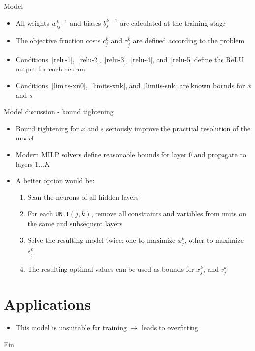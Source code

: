 \documentclass{beamer}
\newcommand{\UNIT}{\texttt{UNIT}$(j,k)$}
\begin{document}
\begin{frame}{Model}
  \begin{itemize}
  \item All weights $w_{ij}^{k-1}$ and biases $b_j^{k-1}$ are calculated at the training stage
  \item The objective function costs $c_j^k$ and $\gamma_j^k$ are defined according to the problem
  \item Conditions~\ref{relu-1},~\ref{relu-2},~\ref{relu-3},~\ref{relu-4}, and~\ref{relu-5} define the ReLU output for each neuron
  \item Conditions~\ref{limits-xn0},~\ref{limits-xnk}, and~\ref{limits-snk} are known bounds for $x$ and $s$
  \end{itemize}
\end{frame}

\begin{frame}{Model discussion - bound tightening}
  \begin{itemize}
  \item Bound tightening for $x$ and $s$ seriously improve the practical resolution of the model
  \item Modern MILP solvers define reasonable bounds for layer $0$ and propagate to layers $1 \dots K$
  \item A better option would be:
    \begin{enumerate}
    \item Scan the neurons of all hidden layers
    \item For each \UNIT, remove all constraints and variables from units on the same and subsequent layers
    \item Solve the resulting model twice: one to maximize $x_j^k$, other to maximize $s_j^k$
    \item The resulting optimal values can be used as bounds for $x_j^k$, and $s_j^k$
    \end{enumerate}
  \end{itemize}
\end{frame}

\section{Applications}
\begin{frame}
  \begin{itemize}
  \item This model is unsuitable for training $\rightarrow$ leads to overfitting
  \end{itemize}
\end{frame}

\begin{frame}
  \Huge{\centerline{Fin}}
\end{frame}
\end{document}

